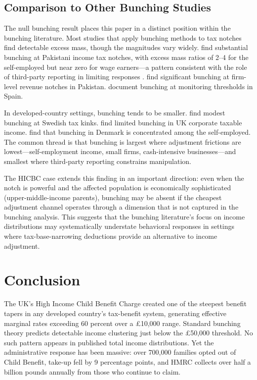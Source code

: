 \documentclass[12pt]{article}
\begin{document}
\subsection{Comparison to Other Bunching Studies}

The null bunching result places this paper in a distinct position within the bunching literature. Most studies that apply bunching methods to tax notches find detectable excess mass, though the magnitudes vary widely. \citet{kleven2013} find substantial bunching at Pakistani income tax notches, with excess mass ratios of 2--4 for the self-employed but near zero for wage earners---a pattern consistent with the role of third-party reporting in limiting responses \citep{kleven2011}. \citet{best2015} find significant bunching at firm-level revenue notches in Pakistan. \citet{almunia2018} document bunching at monitoring thresholds in Spain.

In developed-country settings, bunching tends to be smaller. \citet{bastani2021} find modest bunching at Swedish tax kinks. \citet{devereux2014} find limited bunching in UK corporate taxable income. \citet{le2019} find that bunching in Denmark is concentrated among the self-employed. The common thread is that bunching is largest where adjustment frictions are lowest---self-employment income, small firms, cash-intensive businesses---and smallest where third-party reporting constrains manipulation.

The HICBC case extends this finding in an important direction: even when the notch is powerful and the affected population is economically sophisticated (upper-middle-income parents), bunching may be absent if the cheapest adjustment channel operates through a dimension that is not captured in the bunching analysis. This suggests that the bunching literature's focus on income distributions may systematically understate behavioral responses in settings where tax-base-narrowing deductions provide an alternative to income adjustment.


\section{Conclusion}

The UK's High Income Child Benefit Charge created one of the steepest benefit tapers in any developed country's tax-benefit system, generating effective marginal rates exceeding 60 percent over a \pounds10,000 range. Standard bunching theory predicts detectable income clustering just below the \pounds50,000 threshold. No such pattern appears in published total income distributions. Yet the administrative response has been massive: over 700,000 families opted out of Child Benefit, take-up fell by 9 percentage points, and HMRC collects over half a billion pounds annually from those who continue to claim.
\end{document}
